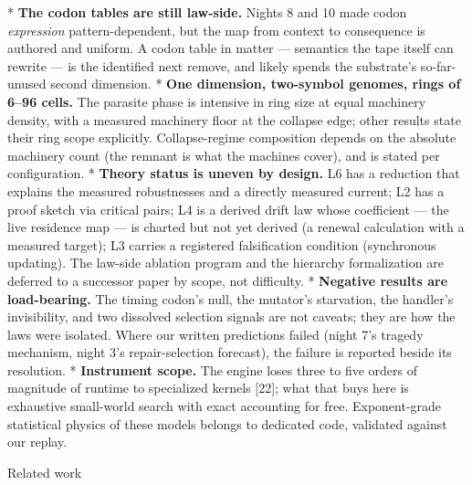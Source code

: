 \begitems
* {\bf The codon tables are still law-side.} Nights 8 and 10 made
codon {\it expression} pattern-dependent, but the map from context
to consequence is authored and uniform. A codon table in matter
--- semantics the tape itself can rewrite --- is the identified
next remove, and likely spends the substrate's so-far-unused
second dimension.
* {\bf One dimension, two-symbol genomes, rings of 6--96 cells.}
The parasite phase is intensive in ring size at equal machinery
density, with a measured machinery floor at the collapse edge;
other results state their ring scope explicitly.
Collapse-regime composition depends on the absolute machinery
count (the remnant is what the machines cover), and is stated per
configuration.
* {\bf Theory status is uneven by design.} L6 has a reduction
that explains the measured robustnesses and a directly measured
current; L2 has a proof sketch via critical pairs; L4 is a
derived drift law whose coefficient --- the live residence map ---
is charted but not yet derived (a renewal calculation with a
measured target); L3 carries a registered falsification condition
(synchronous updating). The law-side ablation program and the
hierarchy formalization are deferred to a successor paper by
scope, not difficulty.
* {\bf Negative results are load-bearing.} The timing codon's
null, the mutator's starvation, the handler's invisibility, and
two dissolved selection signals are not caveats; they are how the
laws were isolated. Where our written predictions failed (night
7's tragedy mechanism, night 3's repair-selection forecast), the
failure is reported beside its resolution.
* {\bf Instrument scope.} The engine loses three to five orders of
magnitude of runtime to specialized kernels [22]; what that buys
here is exhaustive small-world search with exact accounting for
free. Exponent-grade statistical physics of these models belongs
to dedicated code, validated against our replay.
\enditems

\sec Related work

